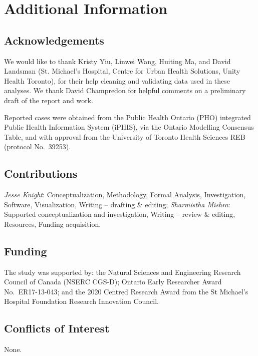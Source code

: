 \section*{Additional Information}
\subsection*{Acknowledgements}
We would like to thank
Kristy Yiu, Linwei Wang, Huiting Ma, and David Landsman (St. Michael's Hospital, 
Centre for Urban Health Solutions, Unity Health Toronto),
for their help cleaning and validating \covid data used in these analyses. 
We thank David Champredon %
for helpful comments on a preliminary draft of the report and work.
\par
Reported \covid cases were obtained
from the Public Health Ontario (PHO) integrated Public Health Information System (iPHIS),
via the Ontario \covid Modelling Consensus Table,
and with approval from the University of Toronto Health Sciences REB (protocol No.\ 39253).
\subsection*{Contributions}
\emph{Jesse Knight}:
  Conceptualization,
  Methodology,
  Formal Analysis,
  Investigation,
  Software,
  Visualization,
  Writing -- drafting \& editing;
\emph{Sharmistha Mishra}:
  Supported conceptualization and investigation,
  Writing -- review \& editing,
  Resources,
  Funding acquisition.
\subsection*{Funding}
The study was supported by:
the Natural Sciences and Engineering Research Council of Canada (NSERC CGS-D);
Ontario Early Researcher Award No.\ ER17-13-043; and
the 2020 \covid Centred Research Award from the St Michael's Hospital Foundation Research Innovation Council.
\subsection*{Conflicts of Interest}
None.
